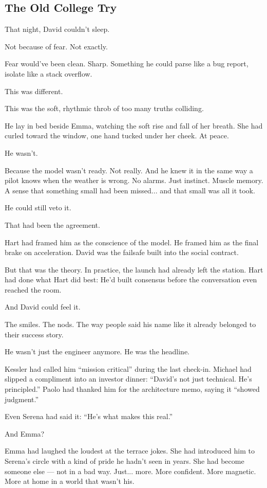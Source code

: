 \subsection{The Old College Try}

That night, David couldn’t sleep.

Not because of fear. Not exactly.

Fear would’ve been clean. Sharp. Something he could parse like a bug report, isolate like a stack overflow.

This was different.

This was the soft, rhythmic throb of too many truths colliding.

He lay in bed beside Emma, watching the soft rise and fall of her breath. She had curled toward the window, 
one hand tucked under her cheek. At peace.

He wasn’t.

Because the model wasn’t ready. Not really. And he knew it in the same way a pilot knows when the 
weather is wrong.  
No alarms. Just instinct. Muscle memory. A sense that something small had been missed... and that 
small was all it took.

He could still veto it.

That had been the agreement.

Hart had framed him as the conscience of the model. He framed him as the final brake on acceleration.  
David was the failsafe built into the social contract.

But that was the theory.  
In practice, the launch had already left the station. Hart had done what Hart did best:  
He’d built consensus before the conversation even reached the room.

And David could feel it.

The smiles. The nods. The way people said his name like it already belonged to their success story.

He wasn’t just the engineer anymore. He was the headline.

Kessler had called him ``mission critical'' during the last check-in.  
Michael had slipped a compliment into an investor dinner: ``David’s not just technical. He’s principled.''  
Paolo had thanked him for the architecture memo, saying it ``showed judgment.''

Even Serena had said it: ``He’s what makes this real.''

And Emma?

Emma had laughed the loudest at the terrace jokes. She had introduced him to Serena’s circle with a 
kind of pride he hadn’t seen in years.  
She had become someone else — not in a bad way. Just... more. More confident. More magnetic. More at 
home in a world that wasn’t his.

